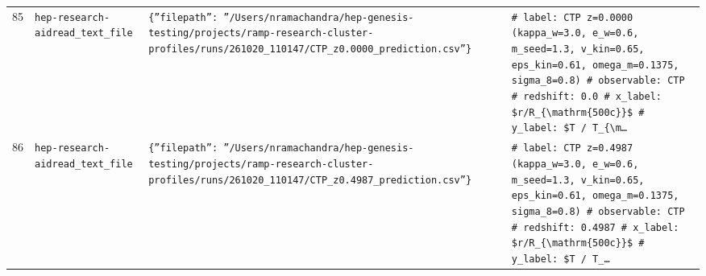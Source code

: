 \documentclass[11pt,a4paper]{article}
\begin{document}
\begin{longtable}{@{}p{}p{}p{}p{}@{}}
85 & \texttt{hep-research-aid}\newline\texttt{read\_\allowbreak{}text\_\allowbreak{}file} & \texttt{\{''filepath'':\allowbreak{} ''/\allowbreak{}Users/\allowbreak{}nramachandra/\allowbreak{}hep-genesis-testing/\allowbreak{}projects/\allowbreak{}ramp-research-cluster-profiles/\allowbreak{}runs/\allowbreak{}261020\_\allowbreak{}110147/\allowbreak{}CTP\_\allowbreak{}z0.0000\_\allowbreak{}prediction.csv''\}\allowbreak{}} & \texttt{\# label:\allowbreak{} CTP z=\allowbreak{}0.0000 (kappa\_\allowbreak{}w=\allowbreak{}3.0,\allowbreak{} e\_\allowbreak{}w=\allowbreak{}0.6,\allowbreak{} m\_\allowbreak{}seed=\allowbreak{}1.3,\allowbreak{} v\_\allowbreak{}kin=\allowbreak{}0.65,\allowbreak{} eps\_\allowbreak{}kin=\allowbreak{}0.61,\allowbreak{} omega\_\allowbreak{}m=\allowbreak{}0.1375,\allowbreak{} sigma\_\allowbreak{}8=\allowbreak{}0.8)\allowbreak{} \# observable:\allowbreak{} CTP \# redshift:\allowbreak{} 0.0 \# x\_\allowbreak{}label:\allowbreak{} \$r/\allowbreak{}R\_\allowbreak{}\{\textbackslash{}\allowbreak{}mathrm\{500c\}\allowbreak{}\}\allowbreak{}\$ \# y\_\allowbreak{}label:\allowbreak{} \$T /\allowbreak{} T\_\allowbreak{}\{\textbackslash{}\allowbreak{}m\ldots{}\allowbreak{}} \\
86 & \texttt{hep-research-aid}\newline\texttt{read\_\allowbreak{}text\_\allowbreak{}file} & \texttt{\{''filepath'':\allowbreak{} ''/\allowbreak{}Users/\allowbreak{}nramachandra/\allowbreak{}hep-genesis-testing/\allowbreak{}projects/\allowbreak{}ramp-research-cluster-profiles/\allowbreak{}runs/\allowbreak{}261020\_\allowbreak{}110147/\allowbreak{}CTP\_\allowbreak{}z0.4987\_\allowbreak{}prediction.csv''\}\allowbreak{}} & \texttt{\# label:\allowbreak{} CTP z=\allowbreak{}0.4987 (kappa\_\allowbreak{}w=\allowbreak{}3.0,\allowbreak{} e\_\allowbreak{}w=\allowbreak{}0.6,\allowbreak{} m\_\allowbreak{}seed=\allowbreak{}1.3,\allowbreak{} v\_\allowbreak{}kin=\allowbreak{}0.65,\allowbreak{} eps\_\allowbreak{}kin=\allowbreak{}0.61,\allowbreak{} omega\_\allowbreak{}m=\allowbreak{}0.1375,\allowbreak{} sigma\_\allowbreak{}8=\allowbreak{}0.8)\allowbreak{} \# observable:\allowbreak{} CTP \# redshift:\allowbreak{} 0.4987 \# x\_\allowbreak{}label:\allowbreak{} \$r/\allowbreak{}R\_\allowbreak{}\{\textbackslash{}\allowbreak{}mathrm\{500c\}\allowbreak{}\}\allowbreak{}\$ \# y\_\allowbreak{}label:\allowbreak{} \$T /\allowbreak{} T\_\allowbreak{}\ldots{}\allowbreak{}} \\

\end{longtable}
\end{document}
